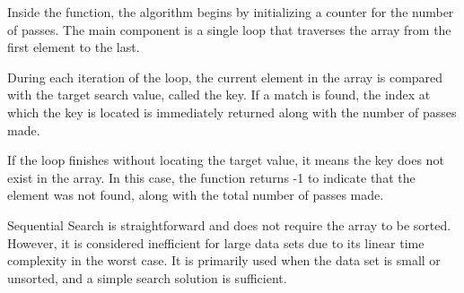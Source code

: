 Inside the function, the algorithm begins by initializing a counter for the number of passes. The main component is a single loop that traverses the array from the first element to the last.

During each iteration of the loop, the current element in the array is compared with the target search value, called the key. If a match is found, the index at which the key is located is immediately returned along with the number of passes made.

If the loop finishes without locating the target value, it means the key does not exist in the array. In this case, the function returns -1 to indicate that the element was not found, along with the total number of passes made.

Sequential Search is straightforward and does not require the array to be sorted. However, it is considered inefficient for large data sets due to its linear time complexity in the worst case. It is primarily used when the data set is small or unsorted, and a simple search solution is sufficient.

